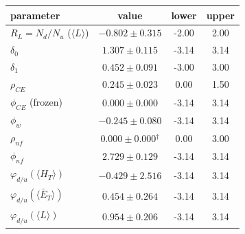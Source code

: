 \begin{tabular}{lccc}
\toprule
parameter & value & lower & upper \\
\midrule
$R_L=N_d/N_u$ ($\langle L\rangle$) & $-0.802 \pm 0.315$ & -2.00 & 2.00 \\
$\delta_0$ & $1.307 \pm 0.115$ & -3.14 & 3.14 \\
$\delta_1$ & $0.452 \pm 0.091$ & -3.00 & 3.00 \\
$\rho_{CE}$ & $0.245 \pm 0.023$ & 0.00 & 1.50 \\
$\phi_{CE}$ (frozen) & $0.000 \pm 0.000$ & -3.14 & 3.14 \\
$\phi_w$ & $-0.245 \pm 0.080$ & -3.14 & 3.14 \\
$\rho_{nf}$ & $0.000 \pm 0.000$$^{\dagger}$ & 0.00 & 3.00 \\
$\phi_{nf}$ & $2.729 \pm 0.129$ & -3.14 & 3.14 \\
$\varphi_{d/u}(\langle H_T\rangle)$ & $-0.429 \pm 2.516$ & -3.14 & 3.14 \\
$\varphi_{d/u}(\langle \bar E_T\rangle)$ & $0.454 \pm 0.264$ & -3.14 & 3.14 \\
$\varphi_{d/u}(\langle L\rangle)$ & $0.954 \pm 0.206$ & -3.14 & 3.14 \\
\bottomrule
\end{tabular}
